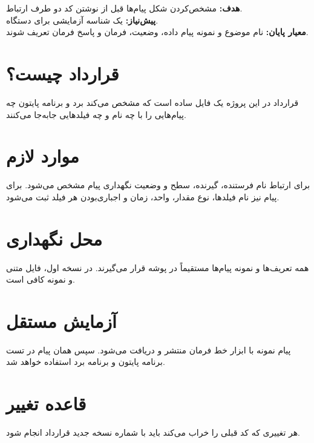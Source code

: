 \begin{phasebox}
\textbf{هدف:} مشخص‌کردن شکل پیام‌ها قبل از نوشتن کد دو طرف ارتباط.\\
\textbf{پیش‌نیاز:} یک شناسه آزمایشی برای دستگاه.\\
\textbf{معیار پایان:} نام موضوع و نمونه پیام داده، وضعیت، فرمان و پاسخ فرمان تعریف شوند.
\end{phasebox}

\section{قرارداد چیست؟}
قرارداد در این پروژه یک فایل ساده است که مشخص می‌کند برد و برنامه پایتون چه پیام‌هایی را با چه نام و چه فیلدهایی جابه‌جا می‌کنند.

\section{موارد لازم}
برای ارتباط
نام
فرستنده، گیرنده، سطح
و وضعیت نگهداری پیام مشخص می‌شود. برای پیام
نیز نام فیلدها، نوع مقدار، واحد، زمان و اجباری‌بودن هر فیلد ثبت می‌شود.

\section{محل نگهداری}
همه تعریف‌ها و نمونه پیام‌ها مستقیماً در پوشه
قرار می‌گیرند. در نسخه اول، فایل متنی و نمونه
کافی است.

\section{آزمایش مستقل}
پیام نمونه با ابزار خط فرمان منتشر و دریافت می‌شود. سپس همان پیام در تست برنامه پایتون و برنامه برد استفاده خواهد شد.

\section{قاعده تغییر}
هر تغییری که کد قبلی را خراب می‌کند باید با شماره نسخه جدید قرارداد انجام شود.
